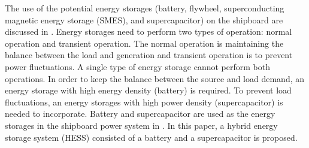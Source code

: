 The use of the potential energy storages (battery, flywheel, superconducting magnetic energy storage (SMES), and supercapacitor) on the shipboard are discussed in \cite{holsonback2006system}. Energy storages need to perform two types of operation: normal operation and transient operation. The normal operation is maintaining the balance between the load and generation and transient operation is to prevent power fluctuations. A single type of energy storage cannot perform both operations. In order to keep the balance between the source and load demand, an energy storage with high energy density (battery) is required. To prevent load fluctuations, an energy storages with high power density (supercapacitor) is needed to incorporate. Battery and supercapacitor are used as the energy storages in the shipboard power system in \cite{li2014real, cohen2016fuzzy}. In this paper, a hybrid energy storage system (HESS) consisted of a battery and a supercapacitor is proposed.  




